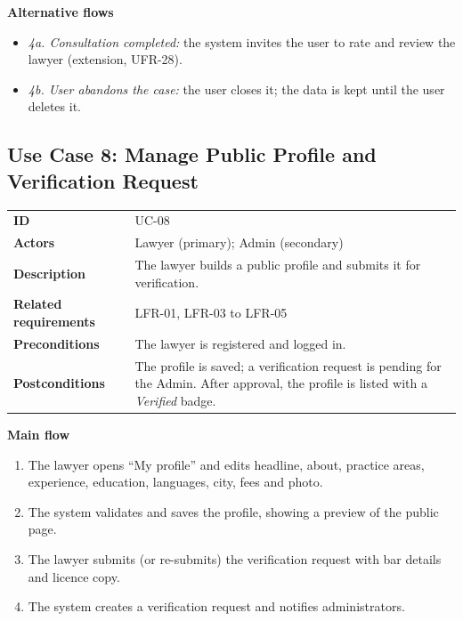 \textbf{Alternative flows}

\begin{itemize}
  \item \emph{4a. Consultation completed:} the system invites the user to rate and review the lawyer (extension, UFR-28).
  \item \emph{4b. User abandons the case:} the user closes it; the data is kept until the user deletes it.
\end{itemize}

\subsection{Use Case 8: Manage Public Profile and Verification Request}

\begin{center}
\begin{tabular}{|L{3.41cm}|L{11.52cm}|}
\hline\headrow {} &  \\ \hline
\textbf{ID} & UC-08 \\ \hline
\textbf{Actors} & Lawyer (primary); Admin (secondary) \\ \hline
\textbf{Description} & The lawyer builds a public profile and submits it for verification. \\ \hline
\textbf{Related requirements} & LFR-01, LFR-03 to LFR-05 \\ \hline
\textbf{Preconditions} & The lawyer is registered and logged in. \\ \hline
\textbf{Postconditions} & The profile is saved; a verification request is pending for the Admin. After approval, the profile is listed with a \emph{Verified} badge. \\ \hline
\end{tabular}
\end{center}

\textbf{Main flow}

\begin{enumerate}
  \item The lawyer opens ``My profile'' and edits headline, about, practice areas, experience, education, languages, city, fees and photo.
  \item The system validates and saves the profile, showing a preview of the public page.
  \item The lawyer submits (or re-submits) the verification request with bar details and licence copy.
  \item The system creates a verification request and notifies administrators.
\end{enumerate}

